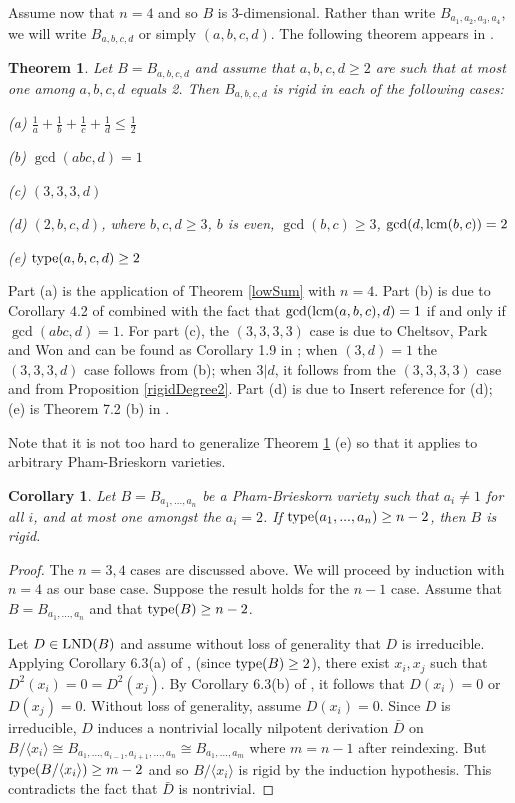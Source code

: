 \documentclass[12pt]{amsart}
\theoremstyle{plain}
\newcommand{\red}{\color{red}}
\newtheorem{theorem}[subsection]{Theorem}
\newtheorem{corollary}[subsection]{Corollary}
\theoremstyle{definition}
\newcommand{\lcm}{		\operatorname{{\rm lcm}}}
\newcommand{\type}{		\operatorname{{\rm type}}}
\newcommand{\lb}{\langle}
\newcommand{\rb}{\rangle}
\newcommand{\lnd}{\operatorname{{\rm LND}}}
\newcommand{\isom}{\cong}
\begin{document}
Assume now that $n=4$ and so $B$ is 3-dimensional. Rather than write $B_{a_1,a_2,a_3,a_4}$, we will write $B_{a,b,c,d}$ or simply $(a,b,c,d)$. The following theorem appears in \cite{LNDsAbelianGroup}.    

\begin{theorem} \label{collection}
	Let $B = B_{a,b,c,d}$ and assume that $a,b,c,d \geq 2$ are such that at most one among $a,b,c,d$ equals 2. Then $B_{a,b,c,d}$ is rigid in each of the following cases:
	
	(a)  $\frac{1}{a} + \frac{1}{b} + \frac{1}{c} + \frac{1}{d} \leq \frac{1}{2}$
	
	(b) $\gcd(abc,d) = 1$
	
	(c) $(3,3,3,d)$
	
	(d) $(2,b,c,d)$, where $b,c,d \geq 3$, $b$ is even, $\gcd(b,c) \geq 3$, $\gcd(d,\lcm(b,c)) = 2$
	
	(e) $\type(a,b,c,d) \geq 2$
\end{theorem}

Part (a) is the application of Theorem \ref{lowSum} with $n=4$. Part (b) is due to Corollary 4.2 of \cite{freudenburg2013} combined with the fact that $\gcd(\lcm(a,b,c),d) = 1$ if and only if $\gcd(abc,d) = 1$. For part (c), the $(3,3,3,3)$ case is due to Cheltsov, Park and Won and can be found as Corollary 1.9 in \cite{affineCones}; when $(3,d) = 1$ the $(3,3,3,d)$ case follows from (b); when $3|d$, it follows from the $(3,3,3,3)$ case and from Proposition \ref{rigidDegree2}. Part (d) is due to {\red Insert reference for (d)}; (e) is Theorem 7.2 (b) in \cite{LNDsAbelianGroup}.

Note that it is not too hard to generalize Theorem \ref{collection} (e) so that it applies to arbitrary Pham-Brieskorn varieties. 

\begin{corollary}
	Let $B = B_{a_1,...,a_n}$ be a Pham-Brieskorn variety such that $a_i \neq 1$ for all $i$, and at most one amongst the $a_i = 2$. If $\type(a_1,...,a_n) \geq n-2$, then $B$ is rigid.  
\end{corollary}

\begin{proof}
	The $n = 3,4$ cases are discussed above. We will proceed by induction with $n=4$ as our base case. Suppose the result holds for the $n-1$ case. Assume that $B = B_{a_1, ..., a_n}$ and that $\type(B) \geq n-2$. 
	
	Let $D \in \lnd(B)$ and assume without loss of generality that $D$ is irreducible. Applying Corollary 6.3(a) of \cite{LNDsAbelianGroup}, (since $\type(B) \geq 2$), there exist $x_i,x_j$ such that $D^2(x_i) = 0 = D^2(x_j)$. By Corollary 6.3(b) of \cite{LNDsAbelianGroup}, it follows that $D(x_i) = 0$ or $D(x_j) = 0$. Without loss of generality, assume $D(x_i) = 0$. Since $D$ is irreducible, $D$ induces a nontrivial locally nilpotent derivation $\bar{D}$ on $B / \lb x_i \rb \isom B_{a_1,...,a_{i-1},a_{i+1},...,a_n} \isom B_{a_1,...,a_m}$ where $m = n-1$ after reindexing. But $\type(B / \lb x_i \rb) \geq m-2$ and so $B / \lb x_i \rb$ is rigid by the induction hypothesis. This contradicts the fact that $\bar{D}$ is nontrivial.        
\end{proof}
\end{document}
